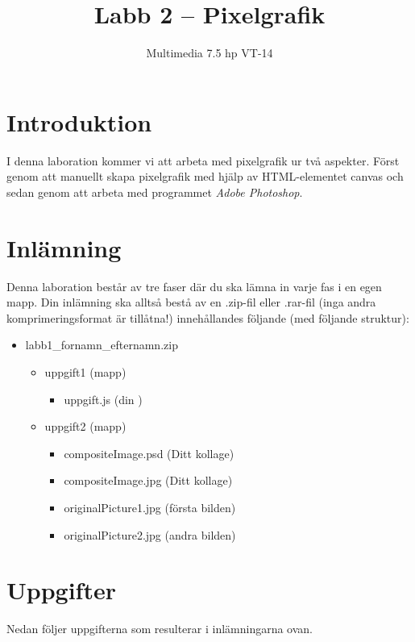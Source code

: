 \documentclass[12pt]{article}
\date{}
\title{ Labb 2 -- Pixelgrafik }
\author{ Multimedia 7.5 hp VT-14 }
\begin{document}
\maketitle
\vspace{-2em}



\section{Introduktion}
I denna laboration kommer vi att arbeta med pixelgrafik ur två aspekter. Först genom att manuellt skapa pixelgrafik med hjälp av HTML-elementet canvas och sedan genom att arbeta med programmet \emph{Adobe Photoshop}.

\section{Inlämning}
Denna laboration består av tre faser där du ska lämna in varje fas i en egen mapp. Din inlämning ska alltså bestå av en .zip-fil eller .rar-fil (inga andra komprimeringsformat är tillåtna!) innehållandes följande (med följande struktur):
  \begin{itemize}
    \item labb1\_fornamn\_efternamn.zip

      \begin{itemize}
        \item uppgift1 (mapp)
          \begin{itemize}
            \item uppgift.js (din )
          \end{itemize}

        \item uppgift2 (mapp)
          \begin{itemize}
	    \item compositeImage.psd (Ditt kollage)
            \item compositeImage.jpg (Ditt kollage)
            \item originalPicture1.jpg (första bilden)
            \item originalPicture2.jpg (andra bilden)
          \end{itemize}
    \end{itemize}
  \end{itemize}


\pagebreak
\section{Uppgifter}
Nedan följer uppgifterna som resulterar i inlämningarna ovan.
\end{document}

